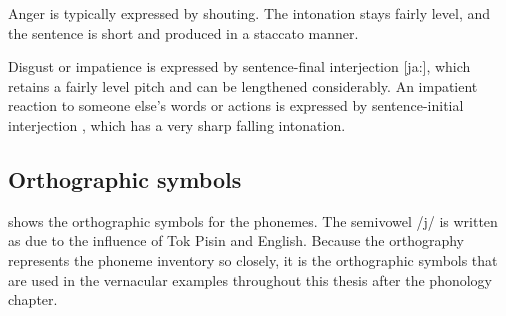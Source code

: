 
Anger is typically expressed by shouting.  The intonation stays fairly level, and the sentence is short and produced in a staccato manner.

Disgust or impatience is expressed by sentence-final interjection  [ja:], which retains a fairly level pitch and can be lengthened considerably.  An impatient reaction to someone else's words or actions is expressed by sentence-initial interjection , which has a very sharp falling intonation.







\subsection{Orthographic symbols}


 shows the orthographic symbols for the phonemes. The semivowel /j/ is written as  due to the influence of Tok Pisin and English.  Because the orthography represents the phoneme inventory so closely, it is the orthographic symbols that are used in the vernacular examples throughout this thesis after the phonology chapter.


